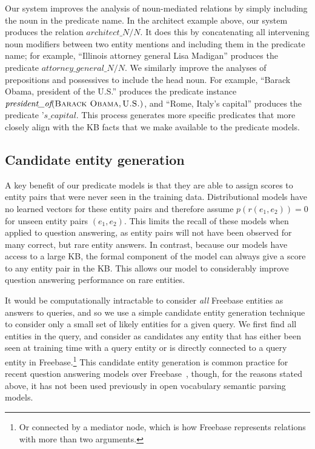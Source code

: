 \documentclass[11pt,letterpaper]{article}
\newcommand{\lexicalpredicate}[1]{\ensuremath{\textit{#1}}}
\newcommand{\entity}[1]{\ensuremath{\textsc{#1}}}
\newcommand{\prob}{\ensuremath{p}}
\begin{document}
Our system improves the analysis of noun-mediated relations by simply including the noun in the
predicate name. In the architect example above, our system produces the relation
\lexicalpredicate{architect\_N/N}. It does this by concatenating all intervening noun modifiers
between two entity mentions and including them in the predicate name; for example, ``Illinois
attorney general Lisa Madigan'' produces the predicate \lexicalpredicate{attorney\_general\_N/N}.
We similarly improve the analyses of prepositions and possessives to include the head noun. For
example, ``Barack Obama, president of the U.S.'' produces the predicate instance
$\lexicalpredicate{president\_of}(\entity{Barack Obama}, \entity{U.S.})$, and ``Rome, Italy's
capital'' produces the predicate \lexicalpredicate{'s\_capital}. This process generates more
specific predicates that more closely align with the KB facts that we make available to the
predicate models.

\subsection{Candidate entity generation}
\label{sec:better-candidates}

A key benefit of our predicate models is that they are able to assign scores to entity pairs that
were never seen in the training data. Distributional models have no learned vectors for these
entity pairs and therefore assume $\prob(r(e_1,e_2)) = 0$ for unseen entity pairs $(e_1,e_2)$. This
limits the recall of these models when applied to question answering, as entity pairs will not have
been observed for many correct, but rare entity answers. In contrast, because our models have
access to a large KB, the formal component of the model can always give a score to any entity pair
in the KB.  This allows our model to considerably improve question answering performance on rare
entities.

It would be computationally intractable to consider \emph{all} Freebase entities as answers to
queries, and so we use a simple candidate entity generation technique to consider only a small set
of likely entities for a given query.  We first find all entities in the query, and consider as
candidates any entity that has either been seen at training time with a query entity or is directly
connected to a query entity in Freebase.\footnote{Or connected by a mediator node, which is how
Freebase represents relations with more than two arguments.} This candidate entity generation is
common practice for recent question answering models over
Freebase~\cite{yih-2015-semparse-query-graph}, though, for the reasons stated above, it has not
been used previously in open vocabulary semantic parsing models.
\end{document}
